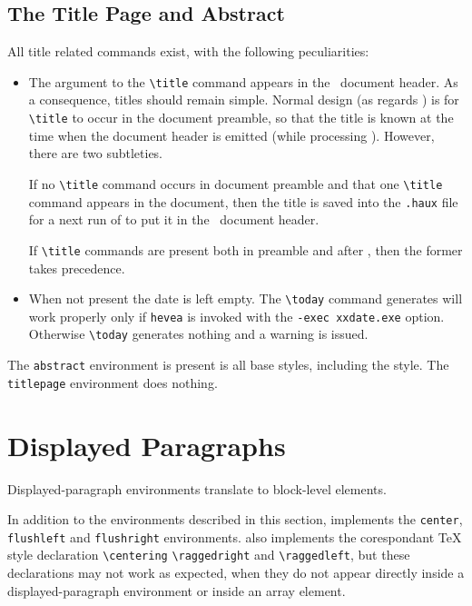\subsection{The Title Page and Abstract}
All title related commands exist, with the following peculiarities:
\begin{itemize}
  \item
  The argument to the \verb+\title+ command appears
  in the \html{}~document header. As a consequence, titles should
  remain simple. Normal design (as regards \hevea{}) is for
  \verb+\title+ to occur in the document preamble, so that the title
  is known at the time when the document header is emitted (while
  processing \verb++). However, there are two subtleties.

  If no \verb+\title+
  command occurs in document preamble and that one \verb+\title+
  command appears in the document, then the title is saved into the
  \texttt{.haux} file for a next run of \hevea{} to put it in the
  \html{}~document header.

  If \verb+\title+ commands are present both in preamble and after
 \verb++, then the former takes precedence.

 \item When not present the date is left empty. The
 \verb+\today+ command generates will work properly
 only if \texttt{hevea} is invoked with the \verb+-exec xxdate.exe+
 option.  Otherwise \verb+\today+ generates nothing and a warning is
 issued.
\end{itemize}

The \verb+abstract+ environment is present is all base styles,
including the  style.
The \verb+titlepage+ environment does nothing.

\section{Displayed Paragraphs}
Displayed-paragraph environments translate to block-level
elements.

In addition to the environments described in this section,
\hevea{} implements the \verb+center+, \verb+flushleft+ and
\verb+flushright+ environments.
\hevea{} also implements the corespondant \TeX{} style declaration
\verb+\centering+ \verb+\raggedright+ and \verb+\raggedleft+,
but these declarations may not work as expected, when they do not
appear directly inside a displayed-paragraph environment or inside an array
element.



